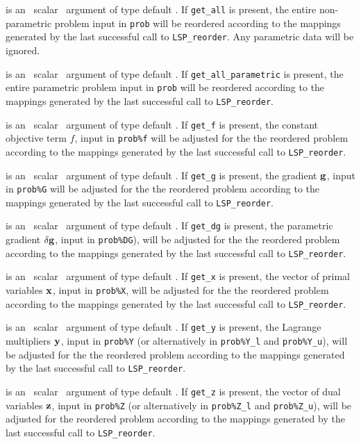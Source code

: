 \documentclass{galahad}
\newcommand{\packagename}{LSP}
\begin{document}
\begin{description}
is an \optional\ scalar \intentin\ argument of type default \logical.
If {\tt get\_all} is present, the entire non-parametric problem
input in {\tt prob} will be reordered according to the
mappings generated by the last successful call to {\tt \packagename\_reorder}.
Any parametric data will be ignored.

is an \optional\ scalar \intentin\ argument of type default \logical.
If {\tt get\_all\_parametric} is present, the entire parametric problem
input in {\tt prob} will be reordered according to the
mappings generated by the last successful call to {\tt \packagename\_reorder}.

is an \optional\ scalar \intentin\ argument of type default \logical.
If {\tt get\_f} is present, the constant objective term
$f$, input in {\tt prob\%f}
will be adjusted for the the reordered problem according to the
mappings generated by the last successful call to {\tt \packagename\_reorder}.

is an \optional\ scalar \intentin\ argument of type default \logical.
If {\tt get\_g} is present, the gradient
${\mathbf{g}}$, input in {\tt prob\%G}
will be adjusted for the the reordered problem according to the
mappings generated by the last successful call to {\tt \packagename\_reorder}.

is an \optional\ scalar \intentin\ argument of type default \logical.
If {\tt get\_dg} is present, the parametric gradient $\delta {\mathbf{g}}$, input in
{\tt prob\%DG}),
will be adjusted for the the reordered problem according to the
mappings generated by the last successful call to {\tt \packagename\_reorder}.

is an \optional\ scalar \intentin\ argument of type default \logical.
If {\tt get\_x} is present, the vector of primal variables ${\mathbf{x}}$,
input in {\tt prob\%X}, will be
adjusted for the the reordered problem according to the
mappings generated by the last successful call to {\tt \packagename\_reorder}.

is an \optional\ scalar \intentin\ argument of type default \logical.
If {\tt get\_y} is present, the
Lagrange multipliers ${\mathbf{y}}$, input in {\tt prob\%Y}
(or alternatively in {\tt prob\%Y\_l} and {\tt prob\%Y\_u}),
will be adjusted for the the reordered problem according to the
mappings generated by the last successful call to {\tt \packagename\_reorder}.

is an \optional\ scalar \intentin\ argument of type default \logical.
If {\tt get\_z} is present, the vector of dual variables ${\mathbf{z}}$, input in
{\tt prob\%Z} (or alternatively in {\tt prob\%Z\_l} and {\tt prob\%Z\_u}),
will be adjusted for the reordered problem according
to the mappings generated by the last successful
call to {\tt \packagename\_reorder}.


\end{description}
\end{document}
